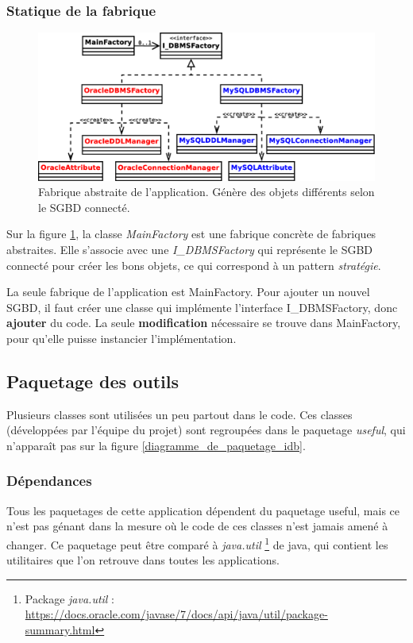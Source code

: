 \subsubsection{Statique de la fabrique}
\begin{figure}[!h]
  \centering
  \includegraphics[width=14cm]{images/diagramme_classes_fabriques.eps}
  \caption{Fabrique abstraite de l'application. Génère des objets différents selon le SGBD connecté.}
  \label{diagramme_classes_fabrique}
\end{figure}

Sur la figure \ref{diagramme_classes_fabrique}, la classe \textit{MainFactory} est une fabrique concrète de fabriques abstraites.
Elle s'associe avec une \textit{I\_DBMSFactory} qui représente le SGBD connecté pour créer les bons objets, ce qui correspond à un pattern \textit{stratégie}.

La seule fabrique de l'application est MainFactory.
Pour ajouter un nouvel SGBD, il faut créer une classe qui implémente l'interface I\_DBMSFactory, donc \textbf{ajouter} du code.
La seule \textbf{modification} nécessaire se trouve dans MainFactory, pour qu'elle puisse instancier l'implémentation.

\subsection{Paquetage des outils}
Plusieurs classes sont utilisées un peu partout dans le code.
Ces classes (développées par l'équipe du projet) sont regroupées dans le paquetage \textit{useful}, qui n'apparaît pas sur la figure \ref{diagramme_de_paquetage_idb}.

\subsubsection{Dépendances}
Tous les paquetages de cette application dépendent du paquetage useful, mais ce n'est pas génant dans la mesure où le code de ces classes n'est jamais amené à changer.
Ce paquetage peut être comparé à \textit{java.util}
\footnote{\label{paguetage_java_util}Package \textit{java.util} : \url{https://docs.oracle.com/javase/7/docs/api/java/util/package-summary.html}}
de java, qui contient les utilitaires que l'on retrouve dans toutes les applications.

